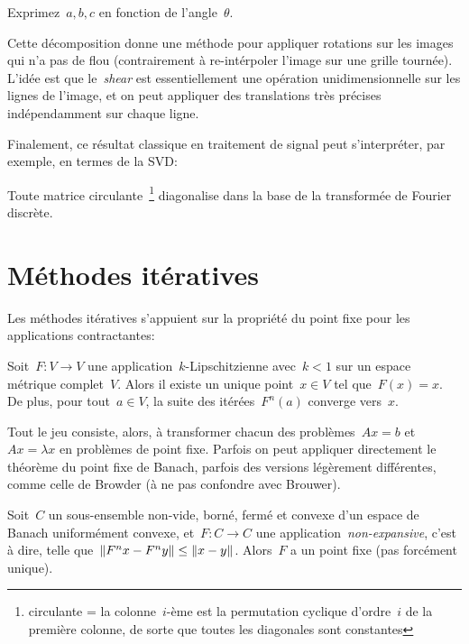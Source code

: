 \begin{exercice}
	Exprimez~$a,b,c$ en fonction de l'angle~$\theta$.
\end{exercice}

Cette décomposition donne une méthode pour appliquer rotations sur les images
qui n'a pas de flou (contrairement à re-intérpoler l'image sur une grille
tournée).  L'idée est que le~\emph{shear} est essentiellement une opération
unidimensionnelle sur les lignes de l'image, et on peut appliquer des
translations très précises indépendamment sur chaque ligne.

\bigskip

Finalement, ce résultat classique en traitement de signal peut s'interpréter,
par exemple, en termes de la SVD:

\begin{proposition}
	Toute matrice circulante~\footnote{circulante = la colonne~$i$-ème est la
	permutation cyclique d'ordre~$i$ de la première colonne, de sorte que
toutes les diagonales sont constantes} diagonalise dans la base de la
transformée de Fourier discrète.
\end{proposition}

\clearpage
\section{Méthodes itératives}

Les méthodes itératives s'appuient sur la propriété du point fixe pour
les applications contractantes:

\begin{proposition}
	Soit~$F:V\to V$ une application~$k$-Lipschitzienne avec~$k<1$ sur un espace
	métrique complet~$V$.  Alors il existe un unique point~$x\in V$ tel
	que~$F(x)=x$.  De plus, pour tout~$a\in V$, la suite des itérées~$F^n(a)$
	converge vers~$x$.
\end{proposition}

Tout le jeu consiste, alors, à transformer chacun des problèmes~$Ax=b$
et~$Ax=\lambda x$ en problèmes de point fixe.  Parfois on peut appliquer
directement le théorème du point fixe de Banach, parfois des versions
légèrement différentes, comme celle de Browder (à ne pas confondre avec
Brouwer).


\begin{proposition}
	Soit~$C$ un sous-ensemble non-vide, borné, fermé et convexe d'un espace de
	Banach uniformément convexe, et~$F:C\to C$ une
	application~\emph{non-expansive}, c'est à dire,
	telle que~$\left\|F^nx-F^ny\right\|\le \left\|x-y\right\|$.  Alors~$F$ a un point fixe (pas
	forcément unique).  %
\end{proposition}

